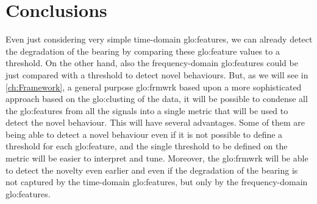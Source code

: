 \section{Conclusions}
Even just considering very simple time-domain \gls{glo:feature}s, we can already detect the degradation of the bearing by comparing these \gls{glo:feature} values to a threshold. On the other hand, also the frequency-domain \gls{glo:feature}s could be just compared with a threshold to detect novel behaviours. But, as we will see in \autoref{ch:Framework}, a general purpose \gls{glo:frmwrk} based upon a more sophisticated approach based on the \gls{glo:clust}ing of the data, it will be possible to condense all the \gls{glo:feature}s from all the signals into a single metric that will be used to detect the novel behaviour. This will have several advantages. Some of them are being able to detect a novel behaviour even if it is not possible to define a threshold for each \gls{glo:feature}, and the single threshold to be defined on the metric will be easier to interpret and tune. Moreover, the \gls{glo:frmwrk} will be able to detect the novelty even earlier and even if the degradation of the bearing is not captured by the time-domain \gls{glo:feature}s, but only by the frequency-domain \gls{glo:feature}s.


